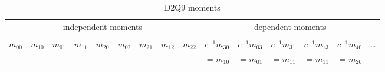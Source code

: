 \setlength{\tabcolsep}{3pt}
\begin{table} [ht!]
  \centering
  \begin{tabular}{r rr rrr rr r rrrrr r}
    \toprule
    \multicolumn{9}{c}{independent moments} & \multicolumn{6}{c}{dependent moments}   \\
    \cmidrule(lr){1-9}\cmidrule(lr){10-15} \\
    $m_{00}$
    & $m_{10}$
    & $m_{01}$
    & $m_{11}$
    & $m_{20}$
    & $m_{02}$
    & $m_{21}$
    & $m_{12}$
    & $m_{22}$
    & $c^{-1}m_{30}$
    & $c^{-1}m_{03}$
    & $c^{-1}m_{31}$
    & $c^{-1}m_{13}$
    & $c^{-1}m_{40}$
    & \ldots \\
    &&&&&&&&
    & = $m_{10}$
    & = $m_{01}$
    & = $m_{11}$
    & = $m_{11}$
    & = $m_{20}$ & \\
    \bottomrule
  \end{tabular}
  \caption{D2Q9 moments}\label{table:D2Q9 moments}
\end{table}
